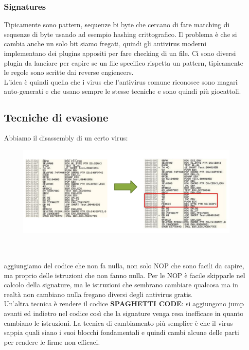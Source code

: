 \documentclass[12pt, oneside]{extbook} %
\begin{document}
\subsubsection{Signatures}
Tipicamente sono pattern, sequenze bi byte che cercano di fare matching di sequenze di byte usando ad esempio hashing crittografico. Il problema è che si cambia anche un solo bit siamo fregati, quindi gli antivirus moderni implementano dei plugins appositi per fare checking di un file. Ci sono diversi plugin da lanciare per capire se un file specifico rispetta un pattern, tipicamente le regole sono scritte dai reverse engieneers.\\L'idea è quindi quella che i virus che l'antivirus comune riconosce sono magari auto-generati e che usano sempre le stesse tecniche e sono quindi più giocattoli.

\subsection{Tecniche di evasione}
Abbiamo il disassembly di un certo virus:\\
\begin{figure}[!h]
	\includegraphics[scale=0.3]{immagini/poly_code.png}
\end{figure}\\\\
aggiungiamo del codice che non fa nulla, non solo NOP che sono facili da capire, ma proprio delle istruzioni che non fanno nulla. Per le NOP è facile skipparle nel calcolo della signature, ma le istruzioni che sembrano cambiare qualcosa ma in realtà non cambiano nulla fregano diversi degli antivirus gratis.\\Un'altra tecnica è rendere il codice \textbf{\textsf{SPAGHETTI CODE}}: si aggiungono jump avanti ed indietro nel codice così che la signature venga resa inefficace in quanto cambiano le istruzioni. La tecnica di cambiamento più semplice è che il virus sappia quali siano i suoi blocchi fondamentali e quindi cambi alcune delle parti per rendere le firme non efficaci.
\end{document}
